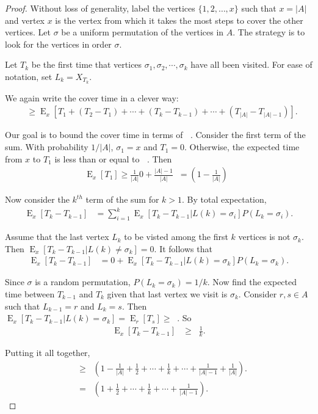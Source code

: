 \documentclass[12pt]{article}
\theoremstyle{definition}
\DeclareMathOperator{\E}{\mathrm{E}}		     %
\DeclareMathOperator{\tcov}{t_\textrm{cov}}      %
\DeclareMathOperator{\tmina}{t_\textrm{min}^A}   %
\begin{document}
\begin{proof}
Without loss of generality, label the vertices $\{1, 2, \ldots, x\}$
such that $x=|A|$ and vertex $x$ is the vertex from which it takes the
most steps to cover the other vertices.
Let $\sigma$ be a uniform permutation of the vertices in $A$.
The strategy is to look for the vertices in order $\sigma$.

Let $T_k$ be the first time that vertices $\sigma_1, \sigma_2, \cdots, \sigma_k$
have all been visited.
For ease of notation, set $L_k = X_{T_k}$.

We again write the cover time in a clever way:
\begin{align}
\tcov &\geq \E_x[T_1 + (T_2 - T_1) + \cdots + 
(T_k - T_{k-1}) + \cdots + (T_{|A|} - T_{|A|-1})] . \nonumber
\end{align}

Our goal is to bound the cover time in terms of $\tmina$.
Consider the first term of the sum.
With probability $1/|A|$, $\sigma_1 = x$ and $T_1=0$.
Otherwise, the expected time from $x$ to $T_1$ is less than or equal to
$\tmina$.
Then
\begin{align}
\E_x[T_1] \geq \frac{1}{|A|}0 + \frac{|A| -1}{|A|} \tmina
= \left(1 - \frac{1}{|A|} \right) \tmina \nonumber
\end{align}

Now consider the $k^{th}$ term of the sum for $k > 1$.
By total expectation,
\begin{align}
\E_x[T_k - T_{k-1}] &=
\sum_{i=1}^k \E_x[T_k - T_{k-1} | L(k) = \sigma_i]
P(L_k = \sigma_i). \nonumber 
\end{align}

Assume that the last vertex $L_k$ to be visted among the first
$k$ vertices is not $\sigma_k$.
Then $\E_x[T_k-T_{k-1}|L(k) \neq \sigma_k] = 0$.
It follows that
\begin{align}
\E_x[T_k - T_{k-1}] &= 0 +
\E_x[T_k - T_{k-1} | L(k) = \sigma_k]
P(L_k = \sigma_k). \nonumber 
\end{align}

Since $\sigma$ is a random permutation, $P(L_k = \sigma_k) = 1/k$.
Now find the expected time between $T_{k-1}$ and $T_{k}$
given that last vertex we visit is $\sigma_k$.
Consider $r, s \in A$ such that $L_{k-1} = r$ and $L_k = s$.
Then $\E_x[T_k - T_{k-1} | L(k) = \sigma_k] = \E_r[T_s] \geq \tmina$.
So
\begin{align}
\E_x[T_k - T_{k-1}] &\geq
\tmina \frac{1}{k}. \nonumber 
\end{align}

Putting it all together,
\begin{align}
\tcov &\geq \tmina \left( 1 - \frac{1}{|A|}+ \frac{1}{2} + \cdots + \frac{1}{k} 
+ \cdots + \frac{1}{|A|-1} + \frac{1}{|A|}\right). \nonumber \\
&= \tmina \left( 1 + \frac{1}{2} + \cdots + \frac{1}{k} 
+ \cdots + \frac{1}{|A|-1} \right). \nonumber
\end{align}
\end{proof}
\end{document}
